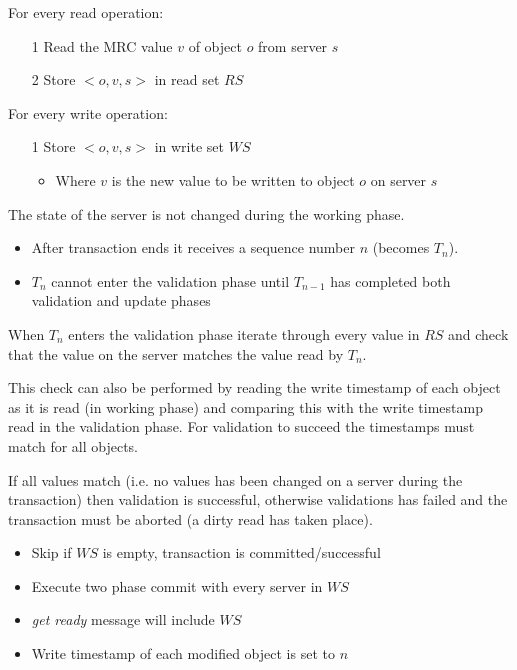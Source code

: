 \documentclass[a4paper]{article}
\begin{document}

For every read operation:

\begin{enumerate}
  \item[1] Read the MRC value $v$ of object $o$ from server $s$
  \item[2] Store $<o,v,s>$ in read set $RS$
\end{enumerate}

For every write operation:

\begin{enumerate}
  \item[1] Store $<o,v,s>$ in write set $WS$
    \begin{itemize}
      \item Where $v$ is the new value to be written to object $o$ on server $s$
    \end{itemize}
\end{enumerate}

The state of the server is not changed during the working phase.


\begin{itemize}
  \item After transaction ends it receives a sequence number $n$ (becomes $T_{n}$).
  \item $T_{n}$ cannot enter the validation phase until $T_{n-1}$ has completed
        both validation and update phases
\end{itemize}

When $T_{n}$ enters the validation phase iterate through every value in $RS$ and
check that the value on the server matches the value read by $T_{n}$.

This check can also be performed by reading the write timestamp of each object
as it is read (in working phase) and comparing this with the write timestamp
read in the validation phase. For validation to succeed the timestamps must
match for all objects.

If all values match (i.e. no values has been changed on a server during the
transaction) then validation is successful, otherwise validations has failed and
the transaction must be aborted (a dirty read has taken place).


\begin{itemize}
  \item Skip if $WS$ is empty, transaction is committed/successful
  \item Execute two phase commit with every server in $WS$
  \item \textit{get ready} message will include $WS$
  \item Write timestamp of each modified object is set to $n$
\end{itemize}
\end{document}
